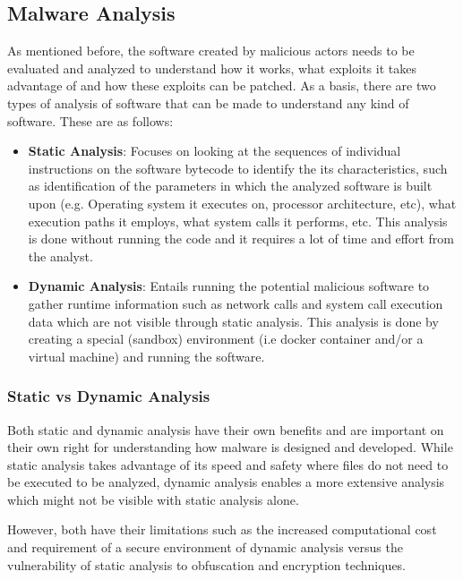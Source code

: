 \subsection{Malware Analysis}
As mentioned before, the software created by malicious actors needs to be evaluated and analyzed to
understand how it works, what exploits it takes advantage of and how these exploits can be patched.
As a basis, there are two types of analysis of software that can be made to understand any kind of
software. These are as follows:
\begin{itemize}
	\item \textbf{Static Analysis}: Focuses on looking at the sequences of individual instructions on the software
	      bytecode to identify the its characteristics, such as identification of the parameters in which the
	      analyzed software is built upon (e.g. Operating system it executes on, processor architecture,
	      etc), what execution paths it employs, what system calls it performs, etc. This analysis is done
	      without running the code and it requires a lot of time and effort from the analyst.
	\item \textbf{Dynamic Analysis}: Entails running the potential malicious software to gather runtime information
	      such as network calls and system call execution data which are not visible through static analysis.
	      This analysis is done by creating a special (sandbox) environment (i.e docker container and/or a virtual
	      machine) and running the software.
\end{itemize}

\subsubsection{Static vs Dynamic Analysis}
Both static and dynamic analysis have their own benefits and are important on their own right for
understanding how malware is designed and developed. While static analysis takes advantage of its
speed and safety where files do not need to be executed to be analyzed, dynamic analysis enables a
more extensive analysis which might not be visible with static analysis alone.

However, both have their limitations such as the increased computational cost and requirement of a
secure environment of dynamic analysis versus the vulnerability of static analysis to obfuscation
and encryption techniques.


